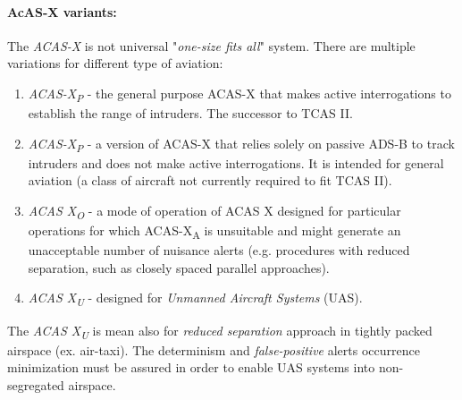 \paragraph{AcAS-X variants:} The \emph{ACAS-X} is not universal "\emph{one-size fits all}" system. There are multiple variations for different type of aviation:
\begin{enumerate}
    \item \emph{ACAS-X\textsubscript{P}} - the general purpose ACAS-X that makes active interrogations to establish the range of intruders. The successor to TCAS II.
    
    \item \emph{ACAS-X\textsubscript{P}} - a version of ACAS-X that relies solely on passive ADS-B to track intruders and does not make active interrogations. It is intended for general aviation (a class of aircraft not currently required to fit TCAS II).
    
    \item \emph{ACAS X\textsubscript{O}} - a mode of operation of ACAS X designed for particular operations for which ACAS-X\textsubscript{A} is unsuitable and might generate an unacceptable number of nuisance alerts (e.g. procedures with reduced separation, such as closely spaced parallel approaches).
    
    \item \emph{ACAS X\textsubscript{U}} - designed for \emph{Unmanned Aircraft Systems} (UAS).
\end{enumerate}

\begin{note}
    The \emph{ACAS X\textsubscript{U}} is mean also for \emph{reduced separation} approach in tightly packed airspace (ex. air-taxi). The determinism and \emph{false-positive} alerts occurrence minimization must be assured in order to enable UAS systems into non-segregated airspace.
\end{note}

